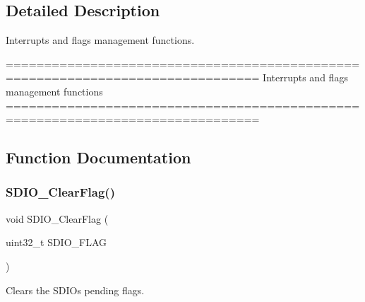 \subsection{Detailed Description}
Interrupts and flags management functions. 

\begin{DoxyVerb} ===============================================================================
                       Interrupts and flags management functions
 ===============================================================================  \end{DoxyVerb}
 

\subsection{Function Documentation}
\mbox{\label{group__SDIO__Group7_ga7aff4efdeb528229135f9f285e53518a}} 
\subsubsection{S\+D\+I\+O\+\_\+\+Clear\+Flag()}
{\footnotesize\ttfamily void S\+D\+I\+O\+\_\+\+Clear\+Flag (\begin{DoxyParamCaption}\item[{uint32\+\_\+t}]{S\+D\+I\+O\+\_\+\+F\+L\+AG }\end{DoxyParamCaption})}



Clears the S\+D\+IO\textquotesingle{}s pending flags. 


